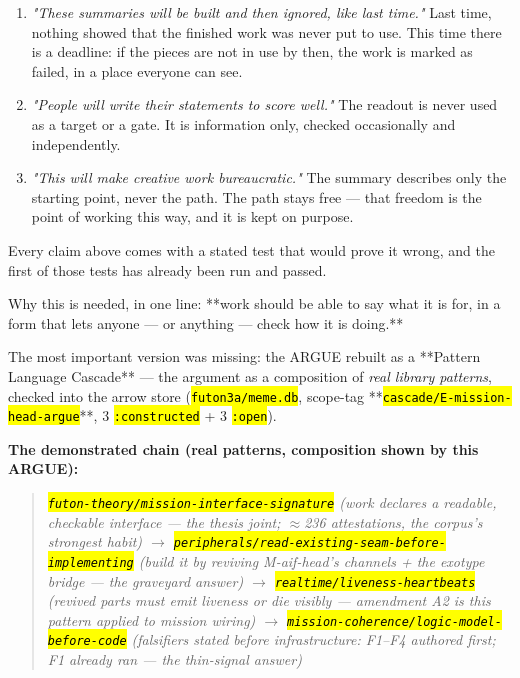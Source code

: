 \documentclass[11pt,oneside]{article}
\newcommand{\scopehl}[1]{\texttt{\hl{#1}}}
\begin{document}
\begin{phasebox}[title={4. ARGUE (2026-06-10) --- the lifeform's self-argument: why should I exist?}]
\begin{subbox}[title={4.1 Plain-language argument (the version anyone can read)}]
\begin{enumerate}[leftmargin=1.4em,itemsep=1pt]
\item \emph{"These summaries will be built and then ignored, like last time."} Last time, nothing showed that the finished work was never put to use. This time there is a deadline: if the pieces are not in use by then, the work is marked as failed, in a place everyone can see.
\item \emph{"People will write their statements to score well."} The readout is never used as a target or a gate. It is information only, checked occasionally and independently.
\item \emph{"This will make creative work bureaucratic."} The summary describes only the starting point, never the path. The path stays free --- that freedom is the point of working this way, and it is kept on purpose.
\end{enumerate}

Every claim above comes with a stated test that would prove it wrong, and the
first of those tests has already been run and passed.

Why this is needed, in one line: **work should be able to say what it is for,
in a form that lets anyone --- or anything --- check how it is doing.**

\end{subbox}
\begin{subbox}[title={4.2 The argument from the pattern language --- a small cascade}]

The most important version was missing: the ARGUE rebuilt as a **Pattern
Language Cascade** --- the argument as a composition of \emph{real library patterns},
checked into the arrow store (\scopehl{futon3a/meme.db}, scope-tag
**\scopehl{cascade/E-mission-head-argue}**, 3 \scopehl{:constructed} + 3 \scopehl{:open}).

\textbf{The demonstrated chain (real patterns, composition shown by this ARGUE):}

\begin{quote}\itshape
\scopehl{futon-theory/mission-interface-signature} (work declares a readable,
checkable interface --- the thesis joint; $\approx$236 attestations, the corpus's
strongest habit)
$\rightarrow$ \scopehl{peripherals/read-existing-seam-before-implementing} (build it by
reviving M-aif-head's channels + the exotype bridge --- the graveyard answer)
$\rightarrow$ \scopehl{realtime/liveness-heartbeats} (revived parts must emit liveness or die
visibly --- amendment A2 \emph{is} this pattern applied to mission wiring)
$\rightarrow$ \scopehl{mission-coherence/logic-model-before-code} (falsifiers stated before
infrastructure: F1--F4 authored first; F1 already ran --- the thin-signal answer)
\end{quote}


\end{subbox}
\end{phasebox}
\end{document}
